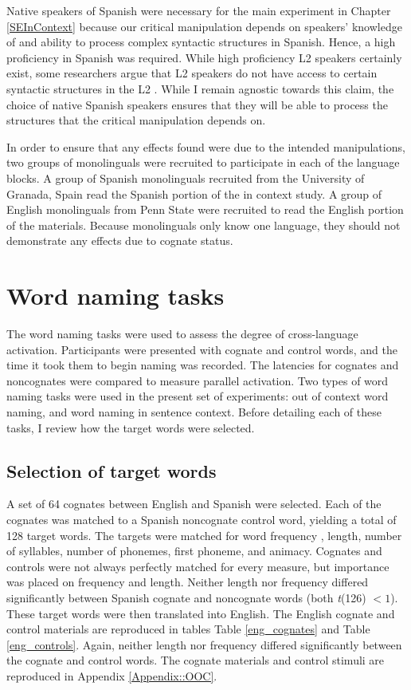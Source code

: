 Native speakers of Spanish were necessary for the main experiment in Chapter \ref{SEInContext} because our critical manipulation depends on speakers' knowledge of and ability to process complex syntactic structures in Spanish. Hence, a  high proficiency in Spanish was required. While high proficiency L2 speakers certainly exist, some researchers argue that L2 speakers do not have access to certain syntactic structures in the L2 \parencite[e.g.,][]{Clahsen2006}. While I remain agnostic towards this claim, the choice of native Spanish speakers ensures that they will be able to process the structures that the critical manipulation depends on. 

In order to ensure that any effects found were due to the intended manipulations, two groups of monolinguals were recruited to participate in each of the language blocks. A group of Spanish monolinguals recruited from the University of Granada, Spain read the Spanish portion of the in context study. A group of English monolinguals from Penn State were recruited to read the English portion of the materials. Because monolinguals only know one language, they should not demonstrate any effects due to cognate status. 

\section{Word naming tasks}
The word naming tasks were used to assess the degree of cross-language activation. Participants were presented with cognate and control words, and the time it took them to begin naming was recorded.  The latencies for cognates and noncognates were compared to measure parallel activation. Two types of word naming tasks were used in the present set of experiments: out of context word naming, and word naming in sentence context. Before detailing each of these tasks, I review how the target words were selected. 

\subsection{Selection of target words}
A set of 64 cognates between English and Spanish were selected. Each of the cognates was matched to a Spanish noncognate control word, yielding a total of 128 target words. The targets were matched for  word frequency \parencite[e.g.,][]{Alameda1995}, length, number of syllables, number of phonemes, first phoneme, and animacy. Cognates and controls were not always perfectly matched for every measure, but importance was placed on frequency and length. Neither length nor frequency differed significantly between Spanish cognate and noncognate words (both \textit{t}(126) $< 1$). These  target words were  then translated into English. The English cognate and control materials are reproduced in tables Table \ref{eng_cognates} and Table \ref{eng_controls}. Again, neither length nor frequency differed significantly between the cognate and control words. The cognate materials and control stimuli are reproduced in Appendix \ref{Appendix::OOC}.


